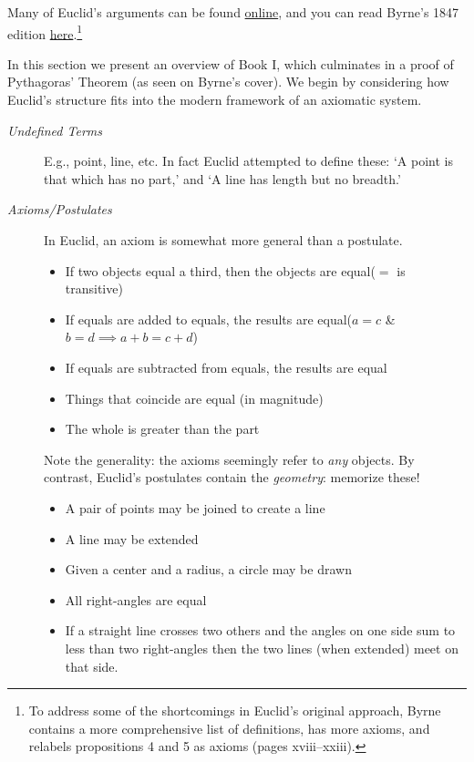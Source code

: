 Many of Euclid's arguments can be found \href{http://math.furman.edu/~jpoole/euclidselements/euclid.htm}{online}, and you can read Byrne's 1847 edition \href{http://math.uci.edu/~ndonalds/Elements-I-VI.pdf}{here}.\footnote{%
	To address some of the shortcomings in Euclid's original approach, Byrne contains a more comprehensive list of definitions, has more axioms, and relabels propositions 4 and 5 as axioms (pages xviii--xxiii). 
}\medbreak

In this section we present an overview of Book I, which culminates in a proof of Pythagoras' Theorem (as seen on Byrne's cover). We begin by considering how Euclid's structure fits into the modern framework of an axiomatic system.


\begin{description}
	\item[\normalfont\emph{Undefined Terms}] E.g., point, line, etc. In fact Euclid attempted to define these: `A point is that which has no part,' and `A line has length but no breadth.'
	
	\item[\normalfont\emph{Axioms/Postulates}] In Euclid, an axiom is somewhat more general than a postulate.
	\begin{itemize}
	  \item[A1] If two objects equal a third, then the objects are equal\hfill ($=$ is transitive)
		\item[A2] If equals are added to equals, the results are equal\hfill ($a=c$ \& $b=d\implies a+b=c+d$)
		\item[A3] If equals are subtracted from equals, the results are equal
		\item[A4] Things that coincide are equal (in magnitude)
		\item[A5] The whole is greater than the part
	\end{itemize}
	Note the generality: the axioms seemingly refer to \emph{any} objects. By contrast, Euclid's postulates contain the \emph{geometry}: memorize these! 
	\begin{itemize}
		\item[P1] A pair of points may be joined to create a line
		\item[P2] A line may be extended
		\item[P3] Given a center and a radius, a circle may be drawn
		\item[P4] All right-angles are equal
		\item[P5]\label{pg:parallelpost} If a straight line crosses two others and the angles on one side sum to less than two right-angles then the two lines (when extended) meet on that side.
	\end{itemize}
\end{description}



